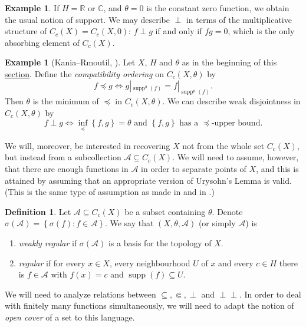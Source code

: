 \documentclass[letter,11pt]{amsart}
\theoremstyle{plain}		\newtheorem{theorem}[generalnumbering]{Theorem}
\theoremstyle{plain}		\newtheorem{corollary}[generalnumbering]{Corollary}
\theoremstyle{definition}		\newtheorem{definition}[generalnumbering]{Definition}
\theoremstyle{definition}		\newtheorem{example}[generalnumbering]{Example}
\theoremstyle{plain}		\newtheorem{proposition}[generalnumbering]{Proposition}
\theoremstyle{plain}		\newtheorem{lemma}[generalnumbering]{Lemma}
\theoremstyle{definition}
\newcommand{\perpp}{\perp\!\!\!\perp}
\DeclareMathOperator{\supp}{supp}
\begin{document}
\begin{example}\label{examplethetaiszero}
	If $H=\mathbb{R}$ or $\mathbb{C}$, and $\theta=0$ is the constant zero function, we obtain the usual notion of support. We may describe $\perp$ in terms of the multiplicative structure of $C_c(X)=C_c(X,0)$: $f\perp g$ if and only if $fg=0$, which is the only absorbing element of $C_c(X)$.
\end{example}

\begin{example}[Kania--Rmoutil, \cite{MR3813611}]\label{examplekaniarmoutil}
	Let $X$, $H$ and $\theta$ as in the beginning of this \hyperref[sectiondisjointness]{section}. Define the \emph{compatibility ordering} on $C_c(X,\theta)$ by
	\[f\preceq g\iff g|_{\supp^\theta(f)}=f|_{\supp^\theta(f)}.\]
	Then $\theta$ is the minimum of $\preceq$ in $C_c(X,\theta)$. We can describe weak disjointness in $C_c(X,\theta)$ by
	\[f\perp g\iff\inf_{\preceq}\left\{f,g\right\}=\theta\text{ and }\left\{f,g\right\}\text{ has a }\preceq\text{-upper bound.}\]
\end{example}

We will, moreover, be interested in recovering $X$ not from the whole set $C_c(X)$, but instead from a subcollection $\mathcal{A}\subseteq C_c(X)$. We will need to assume, however, that there are enough functions in $\mathcal{A}$ in order to separate points of $X$, and this is attained by assuming that an appropriate version of Urysohn's Lemma is valid. (This is the same type of assumption as made in \cite{MR0020715} and in \cite{MR2324919}.)

\begin{definition}\label{definitionregularperpp}
	Let $\mathcal{A}\subseteq C_c(X)$ be a subset containing $\theta$. Denote $\sigma(\mathcal{A})=\left\{\sigma(f):f\in\mathcal{A}\right\}$. We say that $(X,\theta,\mathcal{A})$ (or simply $\mathcal{A}$) is
	\begin{enumerate}
		\item \emph{weakly regular} if $\sigma(\mathcal{A})$ is a basis for the topology of $X$.
		\item \emph{regular} if for every $x\in X$, every neighbourhood $U$ of $x$ and every $c\in H$ there is $f\in\mathcal{A}$ with $f(x)=c$ and $\supp(f)\subseteq U$.
	\end{enumerate}
\end{definition}


We will need to analyze relations between $\subseteq,\Subset,\perp$ and $\perpp$. In order to deal with finitely many functions simultaneously, we will need to adapt the notion of \emph{open cover} of a set to this language.
\end{document}
